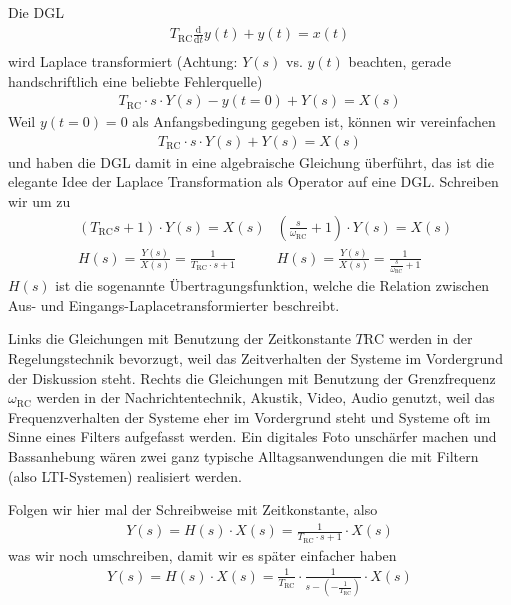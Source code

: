 \documentclass[11pt,a4paper,DIV=12]{scrartcl}
\numberwithin{equation}{section}
\numberwithin{figure}{section}
\newcommand\fsd{\mathrm{d}} %
\begin{document}
\begin{ExCalc}
Die DGL
\begin{align}
T_\mathrm{RC}\frac{\fsd}{\fsd t} y(t) + y(t) = x(t)\\
\end{align}
wird Laplace transformiert (Achtung: $Y(s)$ vs. $y(t)$ beachten,
gerade handschriftlich eine beliebte Fehlerquelle)
\begin{align}
T_\mathrm{RC} \cdot s \cdot Y(s) - y(t=0) + Y(s) = X(s)
\end{align}
Weil $y(t=0)=0$ als Anfangsbedingung gegeben ist, können wir vereinfachen
\begin{align}
T_\mathrm{RC} \cdot s \cdot Y(s) + Y(s) = X(s)
\end{align}
und haben die DGL damit in eine algebraische Gleichung überführt, das ist die
elegante Idee der Laplace Transformation als Operator auf eine DGL.
%
Schreiben wir um zu
\begin{align}
&(T_\mathrm{RC} s + 1 ) \cdot Y(s) = X(s)
& (\frac{s}{\omega_\mathrm{RC}} + 1 ) \cdot Y(s) = X(s) \\
&H(s) = \frac{Y(s)}{X(s)} = \frac{1}{T_\mathrm{RC} \cdot s + 1}
&H(s) = \frac{Y(s)}{X(s)} = \frac{1}{\frac{s}{\omega_\mathrm{RC}} + 1}
\end{align}
%
$H(s)$ ist die sogenannte Übertragungsfunktion, welche
die Relation zwischen Aus- und Eingangs-Laplacetransformierter beschreibt.

Links die Gleichungen mit Benutzung der Zeitkonstante $T\mathrm{RC}$ werden in der
Regelungstechnik bevorzugt, weil das Zeitverhalten der Systeme im Vordergrund
der Diskussion steht.
%
Rechts die Gleichungen mit Benutzung der Grenzfrequenz $\omega_\mathrm{RC}$ werden
in der Nachrichtentechnik, Akustik, Video, Audio genutzt, weil das Frequenzverhalten
der Systeme eher im Vordergrund steht und Systeme oft im Sinne eines Filters
aufgefasst werden. Ein digitales Foto unschärfer machen und Bassanhebung wären zwei ganz
typische Alltagsanwendungen die mit Filtern (also LTI-Systemen) realisiert werden.

Folgen wir hier mal der Schreibweise mit Zeitkonstante, also
\begin{align}
Y(s) = H(s) \cdot X(s) = \frac{1}{T_\mathrm{RC} \cdot s + 1} \cdot X(s)
\end{align}
was wir noch umschreiben, damit wir es später einfacher haben
\begin{align}
Y(s) = H(s) \cdot X(s) = \frac{1}{T_\mathrm{RC}} \cdot \frac{1}{s - (-\frac{1}{T_\mathrm{RC}})} \cdot X(s)
\end{align}


\end{ExCalc}
\end{document}
